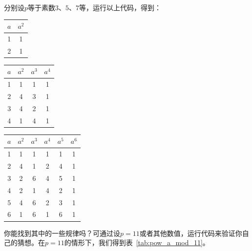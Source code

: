 \begin{example}
	分别设$p$等于素数$3$、$5$、$7$等，运行以上代码，得到：

\begin{minipage}{\textwidth}
	\begin{minipage}[h]{0.3\textwidth}
		\centering
		\begin{tabular}{ | c | c |}
			\hline
			$a$  & $a^2$  \\ \hline
			1 & 1  \\ \hline
			2 & 1  \\ \hline
		\end{tabular}
			\captionsetup{type=table,hypcap=false}\caption{$a^i \bmod 3$}
		\label{tab:pow_a_mod_3}
	\end{minipage}
	\begin{minipage}[h]{0.3\textwidth}
		\centering
	\begin{tabular}{ | c | c | c | c |}
		\hline
		$a$  & $a^2$ & $a^3$ & $a^4$  \\ \hline
		1 & 1 & 1 & 1 \\ \hline
		2 & 4 & 3 & 1 \\ \hline
		3 & 4 & 2 & 1 \\ \hline
		4 & 1 & 4 & 1 \\
		\hline
	\end{tabular}
	\captionsetup{type=table,hypcap=false}\caption{$a^i \bmod 5$}
\label{tab:pow_a_mod_5}
	\end{minipage}
	\begin{minipage}[h]{0.3\textwidth}
		\centering
	\begin{tabular}{ | c | c | c | c | c | c | }
		\hline
		$a$  & $a^2$ & $a^3$ & $a^4$ & $a^5$ & $a^6$ \\ \hline
		1 & 1 & 1 & 1 & 1 & 1 \\ \hline
		2 & 4 & 1 & 2 & 4 & 1 \\ \hline
		3 & 2 & 6 & 4 & 5 & 1 \\ \hline
		4 & 2 & 1 & 4 & 2 & 1 \\ \hline
		5 & 4 & 6 & 2 & 3 & 1 \\ \hline
		6 & 1 & 6 & 1 & 6 & 1 \\
		\hline
	\end{tabular}
  \captionsetup{type=table,hypcap=false}\caption{$a^i \bmod 7$}
  \label{tab:pow_a_mod_7}
	\end{minipage}
\end{minipage}
\end{example}

你能找到其中的一些规律吗？可通过设$p = 11$或者其他数值，运行代码来验证你自己的猜想。在$p = 11$的情形下，我们得到表~\ref{tab:pow_a_mod_11}。

